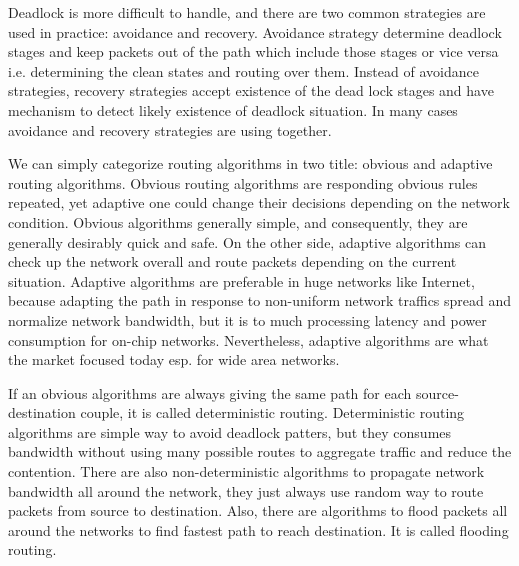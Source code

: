         Deadlock is more difficult to handle, and there are two common strategies are used in practice: avoidance and recovery\cite{hennessy2012computer}. Avoidance strategy determine deadlock stages and keep packets out of the path which include those stages or vice versa i.e. determining the clean states and routing over them. Instead of avoidance strategies, recovery strategies accept existence of the dead lock stages and have mechanism to detect likely existence of deadlock situation. In many cases avoidance and recovery strategies are using together. 

        We can simply categorize routing algorithms in two title: obvious and adaptive routing algorithms. Obvious routing algorithms are responding obvious rules repeated, yet adaptive one could change their decisions depending on the network condition. Obvious algorithms generally simple, and consequently, they are generally desirably quick and safe. On the other side, adaptive algorithms can check up the network overall and route packets depending on the current situation. Adaptive algorithms are preferable in huge networks like Internet\cite{0122007514}, because adapting the path in response to non-uniform network traffics spread and normalize network bandwidth, but it is to much processing latency and power consumption for on-chip networks. Nevertheless, adaptive algorithms are what the market focused today esp. for wide area networks.

        If an obvious algorithms are always giving the same path for each source-destination couple, it is called deterministic routing. Deterministic routing algorithms are simple way to avoid deadlock patters, but they consumes bandwidth without using many possible routes to aggregate traffic and reduce the contention. There are also non-deterministic algorithms to propagate network bandwidth all around the network, they just always use random way to route packets from source to destination. Also, there are algorithms to flood packets all around the networks to find fastest path to reach destination. It is called flooding routing.
